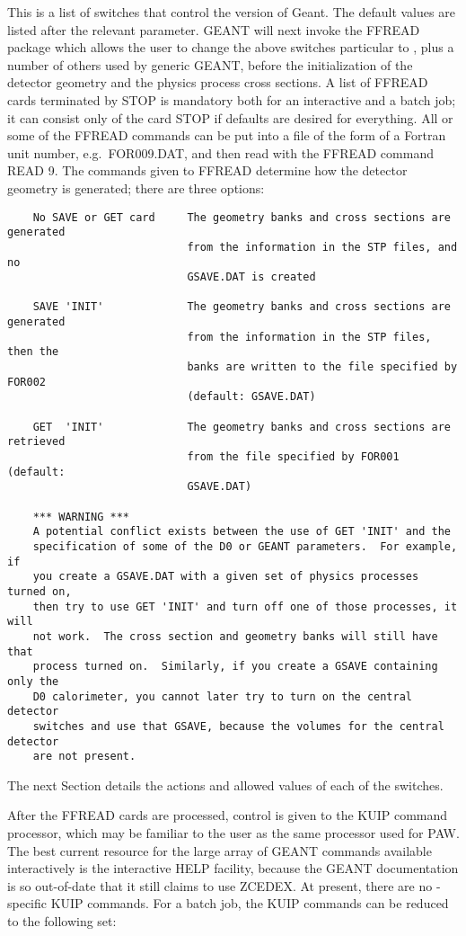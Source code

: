 This is a list of switches that control the  version of Geant.  The
default values are listed after the relevant parameter.  GEANT will next invoke
the FFREAD package which allows the user to change the above switches
particular to , plus a number of others used by generic GEANT, before the
initialization of the detector geometry and the physics process cross sections.
A list of FFREAD cards terminated by STOP is mandatory both for an interactive
and a batch job; it can consist only of the card STOP if defaults are desired
for everything.  All or some of the FFREAD commands can be put into a file
of the form of a Fortran unit number, e.g.\ FOR009.DAT, and then read with the
FFREAD command READ 9.  The commands given to FFREAD determine how the detector
geometry is generated; there are three options:

\begin{verbatim}
    No SAVE or GET card     The geometry banks and cross sections are generated
                            from the information in the STP files, and no
                            GSAVE.DAT is created

    SAVE 'INIT'             The geometry banks and cross sections are generated
                            from the information in the STP files, then the
                            banks are written to the file specified by FOR002
                            (default: GSAVE.DAT)

    GET  'INIT'             The geometry banks and cross sections are retrieved
                            from the file specified by FOR001 (default:
                            GSAVE.DAT)

    *** WARNING ***
    A potential conflict exists between the use of GET 'INIT' and the
    specification of some of the D0 or GEANT parameters.  For example, if
    you create a GSAVE.DAT with a given set of physics processes turned on,
    then try to use GET 'INIT' and turn off one of those processes, it will
    not work.  The cross section and geometry banks will still have that
    process turned on.  Similarly, if you create a GSAVE containing only the
    D0 calorimeter, you cannot later try to turn on the central detector
    switches and use that GSAVE, because the volumes for the central detector
    are not present.
\end{verbatim}

The next Section details the actions and allowed values of each of the
switches.

After the FFREAD cards are processed, control is given to the KUIP command
processor, which may be familiar to the user as the same processor used for
PAW.  The best current resource for the large array of GEANT commands available
interactively is the interactive HELP facility, because the GEANT documentation
is so out-of-date that it
still claims to use ZCEDEX.  At present, there are no -specific KUIP
commands.
For a batch job, the KUIP commands can be
reduced to the following set:

